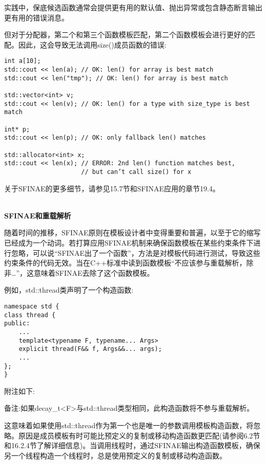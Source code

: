 \begin{tcolorbox}[colback=webgreen!5!white,colframe=webgreen!75!black]
\hspace*{0.75cm}实践中，保底候选函数通常会提供更有用的默认值、抛出异常或包含静态断言输出更有用的错误消息。
\end{tcolorbox}

但对于分配器，第二个和第三个函数模板匹配，第二个函数模板会进行更好的匹配。因此，这会导致无法调用size()成员函数的错误:

\begin{lstlisting}[style=styleCXX]
int a[10];
std::cout << len(a); // OK: len() for array is best match
std::cout << len("tmp"); // OK: len() for array is best match

std::vector<int> v;
std::cout << len(v); // OK: len() for a type with size_type is best match

int* p;
std::cout << len(p); // OK: only fallback len() matches

std::allocator<int> x;
std::cout << len(x); // ERROR: 2nd len() function matches best,
					 // but can’t call size() for x
\end{lstlisting}

关于SFINAE的更多细节，请参见15.7节和SFINAE应用的章节19.4。

\hspace*{\fill} \\ %
\noindent
\textbf{SFINAE和重载解析}

随着时间的推移，SFINAE原则在模板设计者中变得重要和普遍，以至于它的缩写已经成为一个动词。若打算应用SFINAE机制来确保函数模板在某些约束条件下进行忽略，可以说“SFINAE出了一个函数”，方法是对模板代码进行测试，导致这些约束条件的代码无效。当在C++标准中读到函数模板“不应该参与重载解析，除非…”，这意味着SFINAE去除了这个函数模板。

例如，std::thread类声明了一个构造函数:

\begin{lstlisting}[style=styleCXX]
namespace std {
class thread {
public:
	...
	template<typename F, typename... Args>
	explicit thread(F&& f, Args&&... args);
	...
};
}
\end{lstlisting}

附注如下:

备注:如果decay\_t<F>与std::thread类型相同，此构造函数将不参与重载解析。

这意味着如果使用std::thread作为第一个也是唯一的参数调用模板构造函数，将忽略。原因是成员模板有时可能比预定义的复制或移动构造函数更匹配(请参阅6.2节和16.2.4节了解详细信息)。当调用线程时，通过SFINAE输出构造函数模板，确保另一个线程构造一个线程时，总是使用预定义的复制或移动构造函数。

